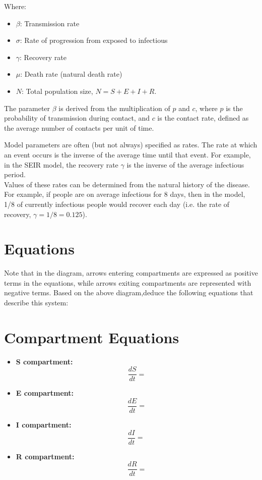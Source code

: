 \documentclass{article}
\begin{document}
Where:
\begin{itemize}
    \item \( \beta \): Transmission rate
    \item \( \sigma \): Rate of progression from exposed to infectious
    \item \( \gamma \): Recovery rate
    \item \( \mu \): Death rate (natural death rate)
    \item \( N \): Total population size, \( N = S + E + I + R \).
\end{itemize}

 The parameter $\beta$ is derived from the multiplication of $p$
  and $c$, where $p$ is the probability of transmission during contact, and $c$ 
  is the contact rate, defined as the average number of contacts per unit of time. 

Model parameters are often (but not always) specified as rates.
The rate at which an event occurs is the inverse of the average time until that event.
For example, in the SEIR model, the recovery rate $\gamma$ is the inverse of the average infectious period.\\

Values of these rates can be determined from the natural history of the disease.
For example,  if people are on average infectious for 8 days, then in the model, 
1/8 of currently infectious people would recover each day
(i.e. the rate of recovery, $\gamma=1/8=0.125$).

\section{Equations}\label{eqs}
Note that in the diagram, arrows entering compartments are expressed as positive 
terms in the equations, while arrows exiting compartments are represented with negative terms.
Based on the above diagram,deduce the following equations that describe this system:

\section*{Compartment Equations}

\begin{itemize}
    \item \textbf{S compartment:}
    \[
    \frac{dS}{dt} = 
    \]
    
    \item \textbf{E compartment:}
    \[
    \frac{dE}{dt} = 
    \]
    \item \textbf{I compartment:}
    \[
    \frac{dI}{dt} = \
    \]
    
    \item \textbf{R compartment:}
    \[
    \frac{dR}{dt} =
    \]
\end{itemize}
\end{document}
